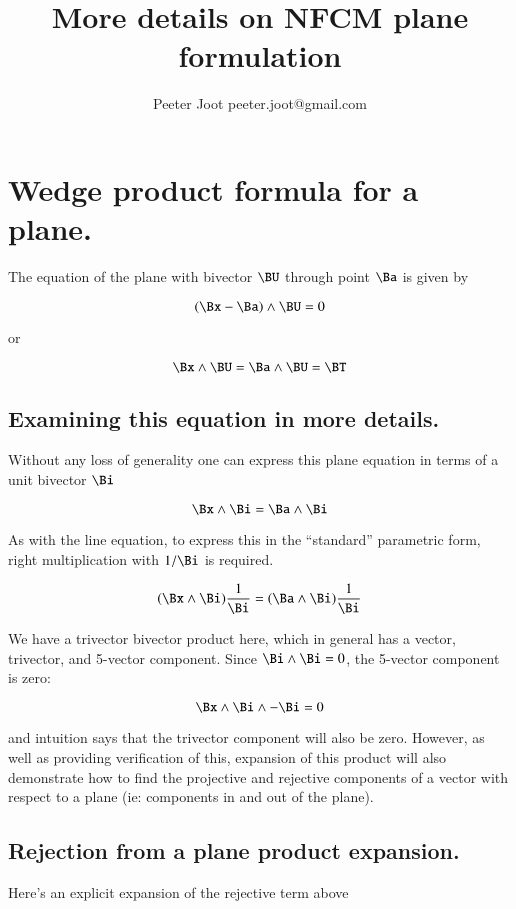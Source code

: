 \documentclass{article}
\title{More details on NFCM plane formulation} %
\author{Peeter Joot \quad peeter.joot@gmail.com}         %
\begin{document}


\section{Wedge product formula for a plane.}

The equation of the plane with bivector $\BU$ through point $\Ba$ is given
by

\[
(\Bx - \Ba) \wedge \BU = 0
\]

or

\[
\Bx \wedge \BU = \Ba \wedge \BU = \BT
\]

\subsection{ Examining this equation in more details. }

Without any loss of generality one can express this plane equation
in terms of a unit bivector $\Bi$

\[
\Bx \wedge \Bi = \Ba \wedge \Bi
\]

As with the line equation, to express this in the ``standard'' parametric
form, right multiplication with $1/\Bi$ is required.

\[
(\Bx \wedge \Bi)\frac{1}{\Bi} = (\Ba \wedge \Bi)\frac{1}{\Bi}
\]

We have a trivector bivector product here, which in general has a vector,
trivector, and 5-vector component.  Since $\Bi \wedge \Bi = 0$, the
5-vector component is zero:

\[
\Bx \wedge \Bi \wedge -\Bi = 0
\]

and intuition says that the trivector component will also be zero.  However,
as well as providing verification of this, expansion of this product will also
demonstrate how to find the projective and rejective components of a vector
with respect to a plane (ie: components in and out of the plane).

\subsection{Rejection from a plane product expansion.}

Here's an explicit expansion of the rejective term above
\end{document}
